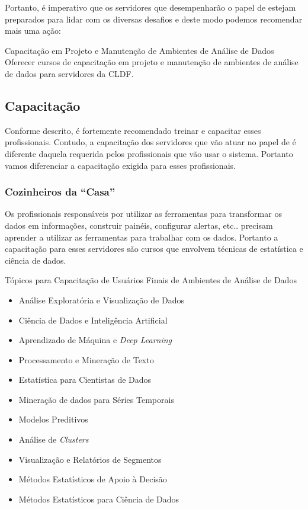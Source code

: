     Portanto, é imperativo que os servidores que desempenharão o papel de \GERENTES \xspace estejam preparados para lidar com os diversas desafios e deste modo podemos recomendar mais uma ação:
    
    \begin{env-proposta}{Capacitação em Projeto e Manutenção de Ambientes de Análise de Dados}
        \nohyphens{Oferecer cursos de capacitação em projeto e manutenção de ambientes de análise de dados para servidores da CLDF.}
    \end{env-proposta}    
    
    \subsection{Capacitação}
    \label{sub-acoes-capacitacao}
    
    Conforme descrito, é fortemente recomendado treinar e capacitar esses profissionais. Contudo, a capacitação dos servidores que vão atuar no papel de \GERENTES \xspace é diferente daquela requerida pelos profissionais que vão usar o sistema. Portanto vamos diferenciar a capacitação exigida para esses profissionais.
    
    \subsubsection*{Cozinheiros da ``Casa''}
    
    Os profissionais responsáveis por utilizar as ferramentas para transformar os dados em informações, construir painéis, configurar alertas, etc.. precisam aprender a utilizar as ferramentas para trabalhar com os dados. Portanto a capacitação para esses servidores são cursos que envolvem técnicas de estatística e ciência de dados.
    
    \begin{env-destaque}{Tópicos para Capacitação de Usuários Finais de Ambientes de Análise de Dados}
        \begin{itemize}
            \item Análise Exploratória e Visualização de Dados
            \item Ciência de Dados e Inteligência Artificial
            \item Aprendizado de Máquina e \emph{Deep Learning}
            \item Processamento e Mineração de Texto
            \item Estatística para Cientistas de Dados
            \item Mineração de dados para Séries Temporais
            \item Modelos Preditivos
            \item Análise de \emph{Clusters}
            \item Visualização e Relatórios de Segmentos
            \item Métodos Estatísticos de Apoio à Decisão
            \item Métodos Estatísticos para Ciência de Dados
        \end{itemize}
    \end{env-destaque}
    
